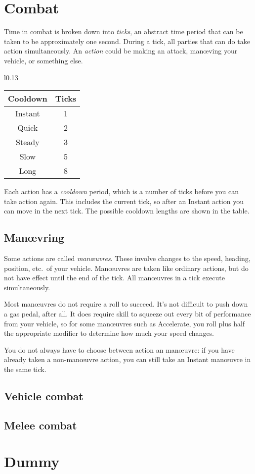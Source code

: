 \documentclass[10pt, a4paper, twocolumn]{article}
\begin{document}
\section{Combat}
Time in combat is broken down into \emph{ticks}, an abstract time period that
can be taken to be approximately one second. During a tick, all parties that
can do take action simultaneously. An \emph{action} could be making an attack,
man\oe{}ving your vehicle, or something else.

\begin{wraptable}[7]{l}{0.13\textwidth}
\vspace*{-3ex}
\begin{tabular}{cc}
  Cooldown & Ticks \\
  \hline 
  Instant  & 1     \\
  Quick    & 2     \\
  Steady   & 3     \\
  Slow     & 5     \\
  Long     & 8
\end{tabular}
\end{wraptable}

Each action has a \emph{cooldown} period, which is a number of ticks before you
can take action again. This includes the current tick, so after an Instant
action you can move in the next tick. The possible cooldown lengths are shown in
the table. 

\subsection{Man\oe{}vring}
Some actions are called \emph{man\oe{}uvres}. These involve changes to the speed,
heading, position, etc.\ of your vehicle. Man\oe{}uvres are taken like ordinary
actions, but do not have effect until the end of the tick. All man\oe{}uvres in a
tick execute simultaneously.

Most man\oe{}uvres do not require a roll to succeed. It's not difficult to push
down a gas pedal, after all. It does require skill to squeeze out every bit of
performance from your vehicle, so for some man\oe{}uvres such as Accelerate, you
roll  plus half the appropriate modifier to determine how much your
speed changes.

You do not always have to choose between action an man\oe{}uvre: if you have
already taken a non-man\oe{}uvre action, you can still take an Instant
man\oe{}uvre in the same tick. 



\subsection{Vehicle combat}
\subsection{Melee combat}

\section{Dummy}
\lipsum{}
\end{document}
